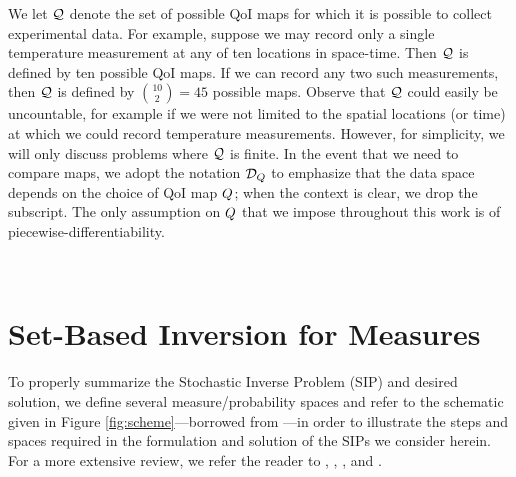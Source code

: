 We let $\mathcal{Q}$ denote the set of possible QoI maps for which it is possible to collect experimental data.
For example, suppose we may record only a single temperature measurement at any of ten locations in space-time.
Then $\mathcal{Q}$ is defined by ten possible QoI maps. 
If we can record any two such measurements, then $\mathcal{Q}$ is defined by $\binom{10}{2} = 45$ possible maps.
Observe that $\mathcal{Q}$ could easily be uncountable, for example if we were not limited to the spatial locations (or time) at which we could record temperature measurements.
However, for simplicity, we will only discuss problems where $\mathcal{Q}$ is finite.
In the event that we need to compare maps, we adopt the notation $\mathcal{D}_{Q}$ to emphasize that the data space depends on the choice of QoI map $Q$; when the context is clear, we drop the subscript.
The only assumption on $Q$ that we impose throughout this work is of piecewise-differentiability.

%




\
\section{Set-Based Inversion for Measures}\label{sec:ch02-set}

To properly summarize the Stochastic Inverse Problem (SIP) and desired solution, we define several measure/probability spaces and refer to the schematic given in Figure \ref{fig:scheme}\----borrowed from \cite{BM17}\----in order to illustrate the steps and spaces required in the formulation and solution of the SIPs we consider herein.
For a more extensive review, we refer the reader to \cite{BBE11}, \cite{BES12}, \cite{BET+14}, and \cite{BM17}. 

